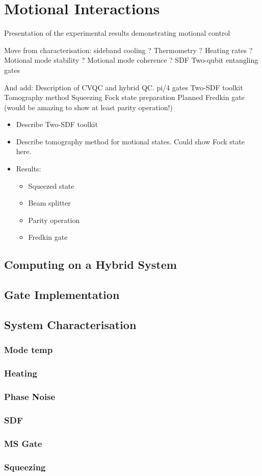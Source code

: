 \chapter{Motional Interactions}
\minitoc
{}

Presentation of the experimental results demonstrating motional control

Move from characterisation: 
    sideband cooling ?
    Thermometry ?
    Heating rates ?
    Motional mode stability ?
    Motional mode coherence ?
    SDF
    Two-qubit entangling gates

And add:
    Description of CVQC and hybrid QC.
    pi/4 gates
    Two-SDF toolkit
    Tomography method
    Squeezing
    Fock state preparation
    Planned Fredkin gate (would be amazing to show at least parity operation!)

\begin{itemize}
    \item Describe Two-SDF toolkit
    \item Describe tomography method for motional states. Could show Fock state here.
    \item Results:
        \begin{itemize}
            \item Squeezed state
            \item Beam splitter
            \item Parity operation
            \item Fredkin gate
        \end{itemize}
\end{itemize}
\section{Computing on a Hybrid System}
\section{Gate Implementation}
\section{System Characterisation}
\subsection{Mode temp}
\subsection{Heating}
\subsection{Phase Noise}
\subsection{SDF}
\subsection{MS Gate}
\subsection{Squeezing}